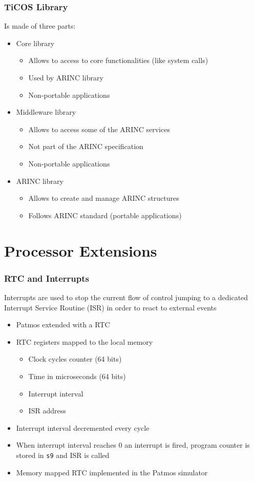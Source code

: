 \documentclass[notheorems]{beamer}
\begin{document}
\begin{frame}
\frametitle{TiCOS Library}
Is made of three parts:
\begin{itemize}
	\item Core library
		\begin{itemize}
			\item Allows to access to core functionalities (like system calls)
			\item Used by ARINC library
			\item Non-portable applications
		\end{itemize}
	\item Middleware library
		\begin{itemize}
			\item Allows to access some of the ARINC services
			\item Not part of the ARINC specification
			\item Non-portable applications
		\end{itemize}
	\item ARINC library
		\begin{itemize}
			\item Allows to create and manage ARINC structures
			\item Follows ARINC standard (portable applications)
		\end{itemize}
\end{itemize}
\end{frame}

\section{Processor Extensions}
\begin{frame}
\frametitle{RTC and Interrupts}
\begin{block}{}
Interrupts are used to stop the current flow of control jumping to a dedicated Interrupt Service Routine (ISR) in order to react to external events~\cite{t-crest:d5.1}
\end{block}
\begin{itemize}
	\item Patmos extended with a RTC
	\item RTC registers mapped to the local memory
		\begin{itemize}
			\item Clock cycles counter (64 bits)
			\item Time in microseconds (64 bits)
			\item Interrupt interval
			\item ISR address
		\end{itemize}
	\item Interrupt interval decremented every cycle
	\item When interrupt interval reaches 0 an interrupt is fired, program counter is stored in \texttt{s9} and ISR is called
	\item Memory mapped RTC implemented in the Patmos simulator
\end{itemize}
\end{frame}
\end{document}
